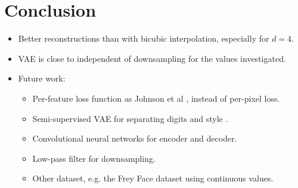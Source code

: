 \section{Conclusion} \label{sec:conclusion}

\begin{itemize}
	\item Better reconstructions than with bicubic interpolation, especially for $d = 4$.
	\item VAE is close to independent of downsampling for the values investigated.
	\item Future work:
	\begin{itemize}
		\item Per-feature loss function as Johnson et al \cite{Johnson16}, instead of per-pixel loss.
		\item Semi-supervised VAE for separating digits and style \cite{Kingma2014}.
		\item Convolutional neural networks for encoder and decoder.
		\item Low-pass filter for downsampling.
		\item Other dataset, e.g. the Frey Face dataset \cite{Frey} using continuous values. 
	\end{itemize}
\end{itemize}
